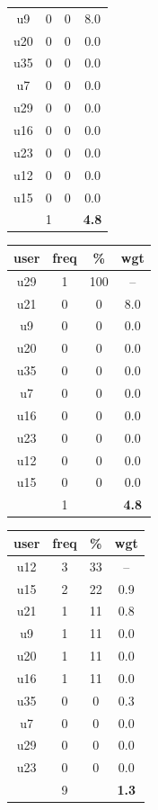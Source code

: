 \begin{table}
\begin{tabular}{ |c|c|c|c| }
	u9 & 0 & 0 & 8.0 \\
	u20 & 0 & 0 & 0.0 \\
	u35 & 0 & 0 & 0.0 \\
	u7 & 0 & 0 & 0.0 \\
	u29 & 0 & 0 & 0.0 \\
	u16 & 0 & 0 & 0.0 \\
	u23 & 0 & 0 & 0.0 \\
	u12 & 0 & 0 & 0.0 \\
	u15 & 0 & 0 & 0.0 \\
	 & 1 & & \textbf{4.8} \\
	\hline
\end{tabular}
\begin{tabular}{ |c|c|c|c| }
	\hline
	\textbf{user} & \textbf{freq} & \textbf{\%} & \textbf{wgt} \\
	\hline
	u29 & 1 & 100 & -- \\
	u21 & 0 & 0 & 8.0 \\
	u9 & 0 & 0 & 0.0 \\
	u20 & 0 & 0 & 0.0 \\
	u35 & 0 & 0 & 0.0 \\
	u7 & 0 & 0 & 0.0 \\
	u16 & 0 & 0 & 0.0 \\
	u23 & 0 & 0 & 0.0 \\
	u12 & 0 & 0 & 0.0 \\
	u15 & 0 & 0 & 0.0 \\
	 & 1 & & \textbf{4.8} \\
	\hline
\end{tabular}
\begin{tabular}{ |c|c|c|c| }
	\hline
	\textbf{user} & \textbf{freq} & \textbf{\%} & \textbf{wgt} \\
	\hline
	u12 & 3 & 33 & -- \\
	u15 & 2 & 22 & 0.9 \\
	u21 & 1 & 11 & 0.8 \\
	u9 & 1 & 11 & 0.0 \\
	u20 & 1 & 11 & 0.0 \\
	u16 & 1 & 11 & 0.0 \\
	u35 & 0 & 0 & 0.3 \\
	u7 & 0 & 0 & 0.0 \\
	u29 & 0 & 0 & 0.0 \\
	u23 & 0 & 0 & 0.0 \\
	 & 9 & & \textbf{1.3} \\
	\hline
\end{tabular}

\end{table}
